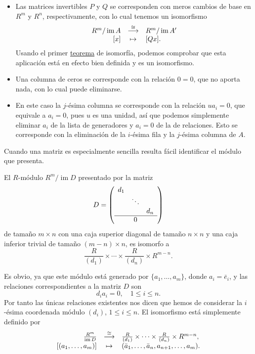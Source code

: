\begin{itemize}
\item
  Las matrices invertibles \(P\) y \(Q\) se corresponden con meros
  cambios de base en \(R^m\) y \(R^n\), respectivamente, con lo cual
  tenemos un isomorfismo \[\begin{array}{rcl}
  R^m/\operatorname{im}A&\stackrel{\cong}\longrightarrow& R^m/\operatorname{im}A'\cr [x]&\mapsto& [Qx].\end{array}\]
  Usando el primer \protect\hyperlink{isomodules}{teorema} de isomorfía,
  podemos comprobar que esta aplicación está en efecto bien definida y
  es un isomorfismo.
\item
  Una columna de ceros se corresponde con la relación \(0=0\), que no
  aporta nada, con lo cual puede eliminarse.
\item
  En este caso la \(j\)-ésima columna se corresponde con la relación
  \(ua_i=0\), que equivale a \(a_i=0\), pues \(u\) es una unidad, así
  que podemos simplemente eliminar \(a_i\) de la lista de generadores y
  \(a_i=0\) de la de relaciones. Esto se corresponde con la eliminación
  de la \(i\)-ésima fila y la \(j\)-ésima columna de \(A\).
\end{itemize}


Cuando una matriz es especialmente sencilla resulta fácil identificar el
módulo que presenta.

\label{easy} El \(R\)-módulo
\(R^m/\operatorname{im}D\) presentado por la matriz
\[D=\left( \begin{array}{ccc} d_1&&\cr &\ddots&\cr &&d_n\cr \hline &0& \end{array} \right)\]
de tamaño \(m\times n\) con una caja superior diagonal de tamaño
\(n\times n\) y una caja inferior trivial de tamaño \((m-n)\times n\),
es isomorfo a
\[\frac{R}{(d_1)}\times \cdots \times\frac{R}{(d_n)}\times R^{m-n}.\]


Es obvio, ya que este módulo está generado por
\(\{a_1,\dots,a_m\}\), donde \(a_i=\bar e_i\), y las relaciones
correspondientes a la matriz \(D\) son
\[d_ia_i=0,\quad 1\leq i\leq n.\] Por tanto las únicas relaciones
existentes nos dicen que hemos de considerar la \(i\)-ésima coordenada
módulo \((d_i)\), \(1\leq i\leq n\). El isomorfismo está simplemente
definido por \[
\begin{array}{rcl}
\frac{R^m}{\operatorname{im} D}
&\stackrel{\cong}\longrightarrow&
\frac{R}{(d_1)}\times \cdots \times\frac{R}{(d_n)}\times R^{m-n},\cr
{[(a_1,\dots,a_m)]}&\mapsto&(\bar{a}_1,\dots, \bar{a}_n,a_{n+1},\dots,a_m).
\end{array}
\] 

